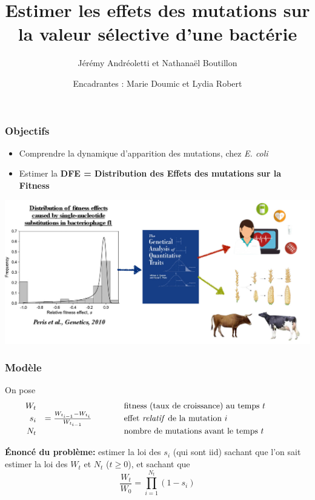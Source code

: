 \documentclass{beamer}
\title[Mutations]{Estimer les effets des mutations sur la valeur sélective d’une bactérie}
\date[2020 -- 2021]{Encadrantes : Marie Doumic et Lydia Robert}
\author[J. Andréoletti, N. Boutillon]{Jérémy Andréoletti et Nathanaël Boutillon}
\newcommand{\comment}[1]{\hspace{1cm}\text{#1}\hspace{1cm}}
\begin{document}
\begin{frame}
  \titlepage
\end{frame}


\begin{frame}
  \frametitle{Objectifs}
  \begin{itemize}[label=$\bullet$]
  \item Comprendre la dynamique d'apparition des mutations, chez \emph{E. coli}
  \item Estimer la \textbf{DFE = Distribution des Effets des mutations sur la Fitness}
  \end{itemize}
  
  \vspace{3mm}

  \begin{centering}
    \includegraphics[scale=0.2]{img/DFE_phage_2010.jpg}
  \end{centering} 
\end{frame}

\begin{frame}
  \frametitle{Modèle}
  On pose
  \[
  \begin{array}{r l l}
    W_t &&\comment{fitness (taux de croissance) au temps $t$}\\
    s_i&=\frac{W_{t_{i-1}}-W_{t_i}}{W_{t_{i-1}}}&\comment{effet \emph{relatif} de la mutation $i$}\\
    N_t &&\comment{nombre de mutations avant le temps $t$}
  \end{array}
  \]

\vspace{0.5cm}%

  \textbf{Énoncé du problème:} estimer la loi des $s_i$ (qui sont iid) sachant que l'on sait estimer la loi des $W_t$ et $N_t$ ($t\geqslant 0$), et sachant que \[\frac{W_t}{W_0}=\prod_{i=1}^{N_t}(1-s_i)\]
\end{frame}
\end{document}
